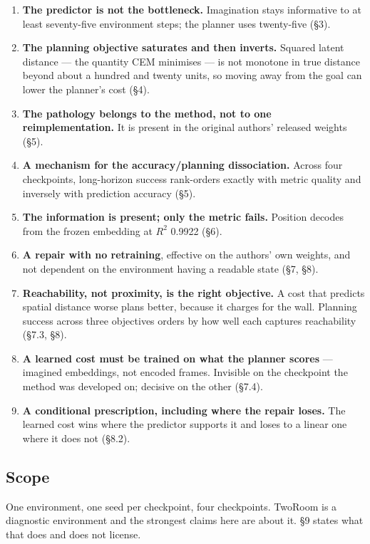 \documentclass[10pt]{article}
\begin{document}
\begin{enumerate}
\def\labelenumi{\arabic{enumi}.}
\item
  \textbf{The predictor is not the bottleneck.} Imagination stays informative to
  at least seventy-five environment steps; the planner uses twenty-five (\S{}3).
\item
  \textbf{The planning objective saturates and then inverts.} Squared latent
  distance --- the quantity CEM minimises --- is not monotone in true distance
  beyond about a hundred and twenty units, so moving away from the goal can
  lower the planner's cost (\S{}4).
\item
  \textbf{The pathology belongs to the method, not to one reimplementation.} It is
  present in the original authors' released weights (\S{}5).
\item
  \textbf{A mechanism for the accuracy/planning dissociation.} Across four
  checkpoints, long-horizon success rank-orders exactly with metric quality
  and inversely with prediction accuracy (\S{}5).
\item
  \textbf{The information is present; only the metric fails.} Position decodes
  from the frozen embedding at $R^{2}$ 0.9922 (\S{}6).
\item
  \textbf{A repair with no retraining}, effective on the authors' own weights, and
  not dependent on the environment having a readable state (\S{}7, \S{}8).
\item
  \textbf{Reachability, not proximity, is the right objective.} A cost that
  predicts spatial distance worse plans better, because it charges for the
  wall. Planning success across three objectives orders by how well each
  captures reachability (\S{}7.3, \S{}8).
\item
  \textbf{A learned cost must be trained on what the planner scores} --- imagined
  embeddings, not encoded frames. Invisible on the checkpoint the method was
  developed on; decisive on the other (\S{}7.4).
\item
  \textbf{A conditional prescription, including where the repair loses.} The
  learned cost wins where the predictor supports it and loses to a linear one
  where it does not (\S{}8.2).
\end{enumerate}

\subsection{Scope}\label{scope}

One environment, one seed per checkpoint, four checkpoints. TwoRoom is a
diagnostic environment and the strongest claims here are about it. \S{}9 states
what that does and does not license.
\end{document}
